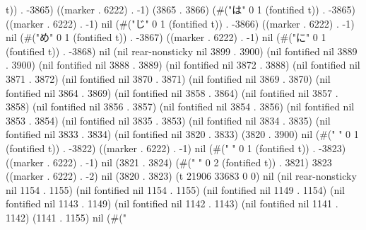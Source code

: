 t)) . -3865) ((marker . 6222) . -1) (3865 . 3866) (#("は" 0 1 (fontified t)) . -3865) ((marker . 6222) . -1) nil (#("じ" 0 1 (fontified t)) . -3866) ((marker . 6222) . -1) nil (#("め" 0 1 (fontified t)) . -3867) ((marker . 6222) . -1) nil (#("に" 0 1 (fontified t)) . -3868) nil (nil rear-nonsticky nil 3899 . 3900) (nil fontified nil 3889 . 3900) (nil fontified nil 3888 . 3889) (nil fontified nil 3872 . 3888) (nil fontified nil 3871 . 3872) (nil fontified nil 3870 . 3871) (nil fontified nil 3869 . 3870) (nil fontified nil 3864 . 3869) (nil fontified nil 3858 . 3864) (nil fontified nil 3857 . 3858) (nil fontified nil 3856 . 3857) (nil fontified nil 3854 . 3856) (nil fontified nil 3853 . 3854) (nil fontified nil 3835 . 3853) (nil fontified nil 3834 . 3835) (nil fontified nil 3833 . 3834) (nil fontified nil 3820 . 3833) (3820 . 3900) nil (#(" " 0 1 (fontified t)) . -3822) ((marker . 6222) . -1) nil (#(" " 0 1 (fontified t)) . -3823) ((marker . 6222) . -1) nil (3821 . 3824) (#("  " 0 2 (fontified t)) . 3821) 3823 ((marker . 6222) . -2) nil (3820 . 3823) (t 21906 33683 0 0) nil (nil rear-nonsticky nil 1154 . 1155) (nil fontified nil 1154 . 1155) (nil fontified nil 1149 . 1154) (nil fontified nil 1143 . 1149) (nil fontified nil 1142 . 1143) (nil fontified nil 1141 . 1142) (1141 . 1155) nil (#("
